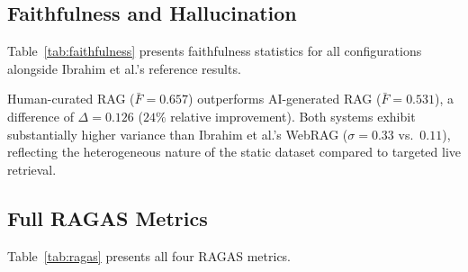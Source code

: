 \documentclass[11pt,a4paper]{article}
\begin{document}
\subsection{Faithfulness and Hallucination}

Table~\ref{tab:faithfulness} presents faithfulness statistics for all
configurations alongside Ibrahim et al.'s reference results.

\begin{table}[ht]
\centering
\caption{Faithfulness Comparison. Mean faithfulness $\in [0,1]$,
higher is better; hallucination rate $= 1 - \text{Mean}$;
\% High-Risk = proportion with faithfulness $< 0.5$.
}
\label{tab:faithfulness}
\end{table}

Human-curated RAG ($\bar{F} = 0.657$) outperforms AI-generated RAG
($\bar{F} = 0.531$), a difference of $\Delta = 0.126$ ($24\%$ relative improvement).
Both systems exhibit substantially higher variance than Ibrahim et al.'s
WebRAG ($\sigma = 0.33$ vs.\ $0.11$), reflecting the heterogeneous nature of
the static dataset compared to targeted live retrieval.

\subsection{Full RAGAS Metrics}

Table~\ref{tab:ragas} presents all four RAGAS metrics.
\end{document}
